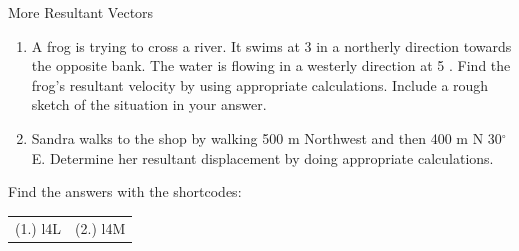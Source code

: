 \begin{exercises}{More Resultant Vectors}
\begin{enumerate}[noitemsep, label=\textbf{\arabic*}.]
\item A frog is trying to cross a river. It swims at 3 \ms in a northerly direction towards the opposite bank. The water is flowing in a westerly direction at 5 \ms. Find the frog's resultant velocity by using appropriate calculations. Include a rough sketch of the situation in your answer.
\item Sandra walks to the shop by walking 500 m Northwest and then 400 m N 30$^\circ$ E. Determine her resultant displacement by doing appropriate calculations.
\end{enumerate}

  \label{59e414b70efc194a27a122db47d06ce6**end}
\par {} Find the answers with the shortcodes:
 \par \begin{tabular}[h]{cc}
 (1.) l4L  &  (2.) l4M   & \end{tabular}
\end{exercises}
% 
% 
